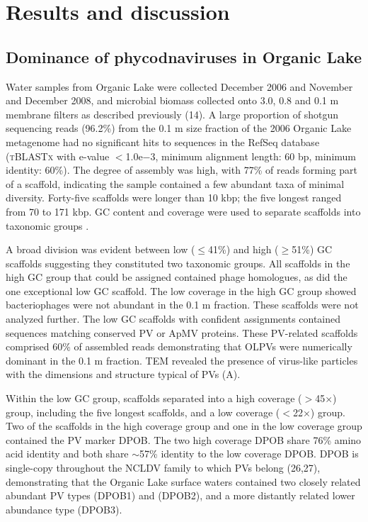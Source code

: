 \section{Results and discussion}
\acresetall
\subsection{Dominance of phycodnaviruses in Organic Lake}
Water samples from Organic Lake were collected December 2006 and November and December 2008, and microbial biomass collected onto 3.0, 0.8 and 0.1 \textmu{}m membrane filters as described previously (14). 
A large proportion of shotgun sequencing reads (96.2\%) from the 0.1 \textmu{}m size fraction of the 2006 Organic Lake metagenome  had no significant hits to sequences in the RefSeq database 
(\textsc{tBLASTx} with e-value $<$1.0e$-$3, minimum alignment length: 60 bp, minimum identity: 60\%). 
The degree of assembly was high, with 77\% of reads forming part of a scaffold, indicating the sample contained a few abundant taxa of minimal diversity. 
Forty-five scaffolds were longer than 10 kbp; the five longest ranged from 70 to 171 kbp. 
GC content and coverage were used to separate scaffolds into taxonomic groups .
 
A broad division was evident between low ($\le$41\%) and high ($\ge$51\%) GC scaffolds suggesting they constituted two taxonomic groups. 
All scaffolds in the high GC group that could be assigned contained phage homologues, as did the one exceptional low GC scaffold. 
The low coverage in the high GC group showed bacteriophages were not abundant in the 0.1 \textmu{}m fraction. 
These scaffolds were not analyzed further. 
The low GC scaffolds with confident assignments contained sequences matching conserved \ac{PV} or \ac{ApMV} proteins. 
These \ac{PV}-related scaffolds comprised 60\% of assembled reads demonstrating that \acp{OLPV} were numerically dominant in the 0.1 \textmu{}m fraction. 
\ac{TEM} revealed the presence of virus-like particles with the dimensions and structure typical of PVs (A).


Within the low GC group, scaffolds separated into a high coverage ($>$45$\times$) group, including the five longest scaffolds, and a low coverage ($<$22$\times$) group. 
Two of the scaffolds in the high coverage group and one in the low coverage group contained the \ac{PV} marker \ac{DPOB}. 
The two high coverage \ac{DPOB} share 76\% amino acid identity and both share $\sim$57\% identity to the low coverage \ac{DPOB}. 
\ac{DPOB} is single-copy throughout the \ac{NCLDV} family to which \acp{PV} belong (26,27), 
demonstrating that the Organic Lake surface waters contained two closely related abundant \ac{PV} types (\ac{DPOB}1) and (\ac{DPOB}2), and a more distantly related lower abundance type (\ac{DPOB}3). 


